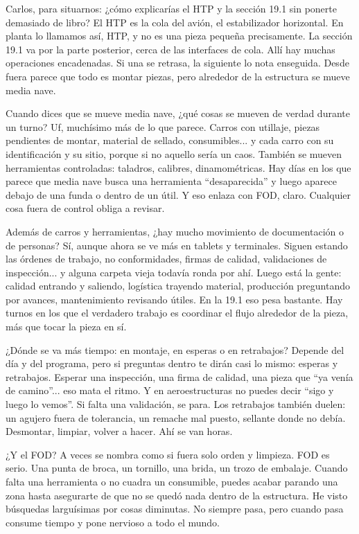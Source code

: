 \begin{interviewtranscript}
\InterviewExchange
{Carlos, para situarnos: ¿cómo explicarías el HTP y la sección 19.1 sin ponerte demasiado de libro?}
{El HTP es la cola del avión, el estabilizador horizontal. En planta lo llamamos así, HTP, y no es una pieza pequeña precisamente. La sección 19.1 va por la parte posterior, cerca de las interfaces de cola. Allí hay muchas operaciones encadenadas. Si una se retrasa, la siguiente lo nota enseguida. Desde fuera parece que todo es montar piezas, pero alrededor de la estructura se mueve media nave.}

\InterviewExchange
{Cuando dices que se mueve media nave, ¿qué cosas se mueven de verdad durante un turno?}
{Uf, muchísimo más de lo que parece. Carros con utillaje, piezas pendientes de montar, material de sellado, consumibles... y cada carro con su identificación y su sitio, porque si no aquello sería un caos. También se mueven herramientas controladas: taladros, calibres, dinamométricas. Hay días en los que parece que media nave busca una herramienta ``desaparecida'' y luego aparece debajo de una funda o dentro de un útil. Y eso enlaza con FOD, claro. Cualquier cosa fuera de control obliga a revisar.}

\InterviewExchange
{Además de carros y herramientas, ¿hay mucho movimiento de documentación o de personas?}
{Sí, aunque ahora se ve más en tablets y terminales. Siguen estando las órdenes de trabajo, no conformidades, firmas de calidad, validaciones de inspección... y alguna carpeta vieja todavía ronda por ahí. Luego está la gente: calidad entrando y saliendo, logística trayendo material, producción preguntando por avances, mantenimiento revisando útiles. En la 19.1 eso pesa bastante. Hay turnos en los que el verdadero trabajo es coordinar el flujo alrededor de la pieza, más que tocar la pieza en sí.}

\InterviewExchange
{¿Dónde se va más tiempo: en montaje, en esperas o en retrabajos?}
{Depende del día y del programa, pero si preguntas dentro te dirán casi lo mismo: esperas y retrabajos. Esperar una inspección, una firma de calidad, una pieza que ``ya venía de camino''... eso mata el ritmo. Y en aeroestructuras no puedes decir ``sigo y luego lo vemos''. Si falta una validación, se para. Los retrabajos también duelen: un agujero fuera de tolerancia, un remache mal puesto, sellante donde no debía. Desmontar, limpiar, volver a hacer. Ahí se van horas.}

\InterviewExchange
{¿Y el FOD? A veces se nombra como si fuera solo orden y limpieza.}
{FOD es serio. Una punta de broca, un tornillo, una brida, un trozo de embalaje. Cuando falta una herramienta o no cuadra un consumible, puedes acabar parando una zona hasta asegurarte de que no se quedó nada dentro de la estructura. He visto búsquedas larguísimas por cosas diminutas. No siempre pasa, pero cuando pasa consume tiempo y pone nervioso a todo el mundo.}


\end{interviewtranscript}
